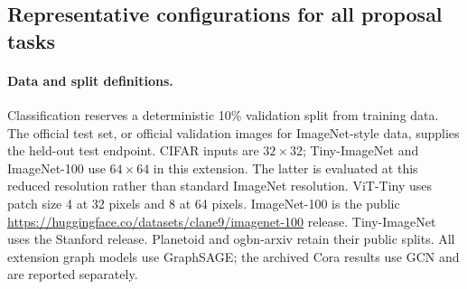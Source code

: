 \subsection{Representative configurations for all proposal tasks}
\begin{table}[ht]
\centering\small
\caption{The original plan: 27 representative configurations and six methods
per configuration. Table~\ref{tab:extension} and the result ledger distinguish
completed from unfinished runs.}
\end{table}

\paragraph{Data and split definitions.}
Classification reserves a deterministic 10\% validation split from training
data. The official test set, or official validation images for ImageNet-style
data, supplies the held-out test endpoint. CIFAR inputs are $32\times32$;
Tiny-ImageNet and ImageNet-100 use $64\times64$ in this extension. The latter
is evaluated at this reduced resolution rather than standard ImageNet
resolution. ViT-Tiny uses patch size 4 at 32 pixels and 8 at 64 pixels.
ImageNet-100 is the public \url{https://huggingface.co/datasets/clane9/imagenet-100}
release. Tiny-ImageNet uses the Stanford release. Planetoid and ogbn-arxiv
retain their public splits. All extension graph models use GraphSAGE;
the archived Cora results use GCN and are reported separately.

